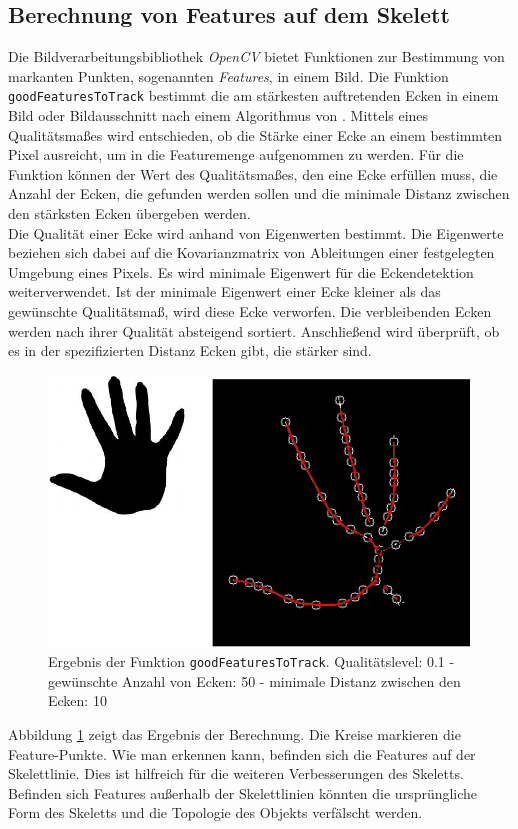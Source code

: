 \subsection{Berechnung von Features auf dem Skelett}
\label{subsec:features}
Die Bildverarbeitungsbibliothek \emph{OpenCV} bietet Funktionen zur Bestimmung von markanten Punkten, sogenannten \emph{Features},
in einem Bild. Die Funktion \texttt{goodFeaturesToTrack} bestimmt die am stärkesten auftretenden Ecken in einem Bild oder Bildausschnitt nach einem Algorithmus von \cite{goodfeatures}. Mittels eines Qualitätsmaßes wird entschieden, ob die Stärke einer
Ecke an einem bestimmten Pixel ausreicht, um in die Featuremenge aufgenommen zu werden. Für die
Funktion können der Wert des Qualitätsmaßes, den eine Ecke erfüllen muss, die Anzahl der Ecken, die gefunden werden sollen und die
minimale Distanz zwischen den stärksten Ecken übergeben werden.\\
Die Qualität einer Ecke wird anhand von Eigenwerten bestimmt. Die Eigenwerte beziehen sich dabei auf 
die Kovarianzmatrix von Ableitungen einer festgelegten Umgebung eines Pixels. Es wird minimale Eigenwert
für die Eckendetektion weiterverwendet. Ist der minimale Eigenwert einer Ecke kleiner als das gewünschte
Qualitätsmaß, wird diese Ecke verworfen. Die verbleibenden Ecken werden nach ihrer Qualität absteigend sortiert. Anschließend wird überprüft, ob es in der spezifizierten Distanz Ecken gibt, die stärker sind. 
\begin{figure}[htbp]
\centering
\includegraphics[width=0.4\linewidth]{./fig/features}
\caption{Ergebnis der Funktion \texttt{goodFeaturesToTrack}. Qualitätslevel: 0.1 - gewünschte Anzahl von Ecken: 50 - minimale Distanz zwischen den Ecken: 10}
\label{fig:features}
\end{figure}
Abbildung \ref{fig:features} zeigt das Ergebnis der Berechnung. Die Kreise markieren die Feature-Punkte. Wie man erkennen kann, befinden sich die Features auf der Skelettlinie. Dies ist hilfreich für die weiteren
Verbesserungen des Skeletts. Befinden sich Features außerhalb der Skelettlinien könnten die ursprüngliche Form des Skeletts und die Topologie des Objekts verfälscht werden.

